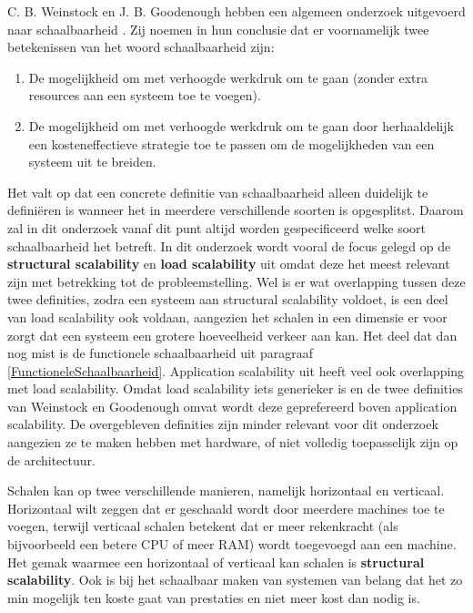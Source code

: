 C. B. Weinstock en J. B. Goodenough hebben een algemeen onderzoek uitgevoerd naar schaalbaarheid \parencite{OnSystemScalability}. Zij noemen in hun conclusie dat er voornamelijk twee betekenissen van het woord schaalbaarheid zijn:
\begin{enumerate}
	\item De mogelijkheid om met verhoogde werkdruk om te gaan (zonder extra resources aan een systeem toe te voegen).
	\item De mogelijkheid om met verhoogde werkdruk om te gaan door herhaaldelijk een kosteneffectieve strategie toe te passen om de mogelijkheden van een systeem uit te breiden.
\end{enumerate}
Het valt op dat een concrete definitie van schaalbaarheid alleen duidelijk te definiëren is wanneer het in meerdere verschillende soorten is opgesplitst. Daarom zal in dit onderzoek vanaf dit punt altijd worden gespecificeerd welke soort schaalbaarheid het betreft. In dit onderzoek wordt vooral de focus gelegd op de \textbf{structural scalability} en \textbf{load scalability} uit \parencite{ScalabilityCharacteristics} omdat deze het meest relevant zijn met betrekking tot de probleemstelling. Wel is er wat overlapping tussen deze twee definities, zodra een systeem aan structural scalability voldoet, is een deel van load scalability ook voldaan, aangezien het schalen in een dimensie er voor zorgt dat een systeem een grotere hoeveelheid verkeer aan kan. Het deel dat dan nog mist is de functionele schaalbaarheid uit paragraaf \ref{FunctioneleSchaalbaarheid}. Application scalability uit \parencite{AdvancedArchitecture} heeft veel ook overlapping met load scalability. Omdat load scalability iets generieker is en de twee definities van Weinstock en Goodenough \parencite{OnSystemScalability} omvat wordt deze geprefereerd boven application scalability. De overgebleven definities zijn minder relevant voor dit onderzoek aangezien ze te maken hebben met hardware, of niet volledig toepasselijk zijn op de architectuur.

Schalen kan op twee verschillende manieren, namelijk horizontaal en verticaal. Horizontaal wilt zeggen dat er geschaald wordt door meerdere machines toe te voegen, terwijl verticaal schalen betekent dat er  meer rekenkracht (als bijvoorbeeld een betere CPU of meer RAM) wordt toegevoegd aan een machine. Het gemak waarmee een horizontaal of verticaal kan schalen is \textbf{structural scalability}. Ook is bij het schaalbaar maken van systemen van belang dat het zo min mogelijk ten koste gaat van prestaties en niet meer kost dan nodig is.


